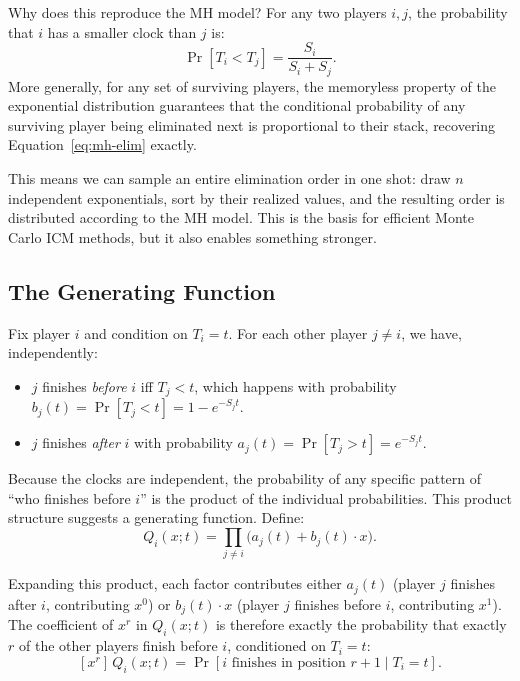 \documentclass[11pt]{article}
\begin{document}
Why does this reproduce the MH model? For any two players $i, j$, the
probability that $i$ has a smaller clock than $j$ is:
\[
  \Pr[T_i < T_j] = \frac{S_i}{S_i + S_j}.
\]
More generally, for any set of surviving players, the memoryless property
of the exponential distribution guarantees that the conditional probability
of any surviving player being eliminated next is proportional to their
stack, recovering Equation~\ref{eq:mh-elim} exactly.

This means we can sample an entire elimination order in one shot: draw $n$
independent exponentials, sort by their realized values, and the resulting
order is distributed according to the MH model. This is the basis for
efficient Monte Carlo ICM methods, but it also enables something stronger.

\subsection{The Generating Function}

Fix player $i$ and condition on $T_i = t$. For each other player $j \neq i$,
we have, independently:
\begin{itemize}
  \item $j$ finishes \emph{before} $i$ iff $T_j < t$, which happens with
    probability $b_j(t) = \Pr[T_j < t] = 1 - e^{-S_j t}$.
  \item $j$ finishes \emph{after} $i$ with probability
    $a_j(t) = \Pr[T_j > t] = e^{-S_j t}$.
\end{itemize}

Because the clocks are independent, the probability of any specific pattern
of ``who finishes before $i$'' is the product of the individual
probabilities. This product structure suggests a generating function.
Define:
\begin{equation}\label{eq:gen-func-def}
  Q_i(x; t) = \prod_{j \neq i} \bigl(a_j(t) + b_j(t) \cdot x\bigr).
\end{equation}

Expanding this product, each factor contributes either $a_j(t)$ (player $j$
finishes after $i$, contributing $x^0$) or $b_j(t) \cdot x$ (player $j$
finishes before $i$, contributing $x^1$). The coefficient of $x^r$ in
$Q_i(x; t)$ is therefore exactly the probability that exactly $r$ of the
other players finish before $i$, conditioned on $T_i = t$:
\begin{equation}\label{eq:coeff-meaning}
  [x^r]\, Q_i(x; t) = \Pr[i \text{ finishes in position } r+1 \mid T_i = t].
\end{equation}
\end{document}
